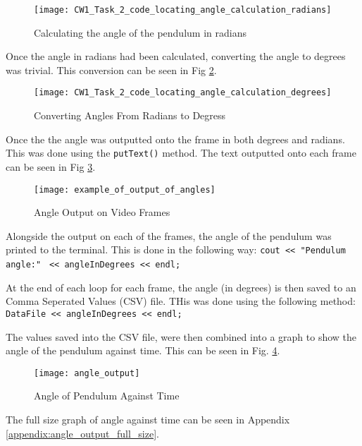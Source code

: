 \documentclass[conference]{IEEEtran}
\begin{document}
\begin{figure}
\centerline{\texttt{[image: CW1\_Task\_2\_code\_locating\_angle\_calculation\_radians]}}
\caption{Calculating the angle of the pendulum in radians}
\label{fig:CW1_Task_2_code_locating_angle_calculation_radians}
\end{figure}

Once the angle in radians had been calculated, converting the angle to degrees was trivial. This conversion can be seen in Fig \ref{fig:CW1_Task_2_code_locating_angle_calculation_degrees}.

\begin{figure}
\centerline{\texttt{[image: CW1\_Task\_2\_code\_locating\_angle\_calculation\_degrees]}}
\caption{Converting Angles From Radians to Degress}
\label{fig:CW1_Task_2_code_locating_angle_calculation_degrees}
\end{figure}

Once the the angle was outputted onto the frame in both degrees and radians. This was done using the \verb|putText()| method. The text outputted onto each frame can be seen in Fig \ref{fig:example_of_output_of_angles}.

\begin{figure}
\centerline{\texttt{[image: example\_of\_output\_of\_angles]}}
\caption{Angle Output on Video Frames}
\label{fig:example_of_output_of_angles}
\end{figure}

Alongside the output on each of the frames, the angle of the pendulum was printed to the terminal. This is done in the following way: \verb|cout << "Pendulum angle:"|
\verb| << angleInDegrees << endl;|

At the end of each loop for each frame, the angle (in degrees) is then saved to an Comma Seperated Values (CSV) file. THis was done using the following method: \verb|DataFile << angleInDegrees << endl;|

The values saved into the CSV file, were then combined into a graph to show the angle of the pendulum against time. This can be seen in Fig. \ref{fig:angle_output}.

\begin{figure}
\centerline{\texttt{[image: angle\_output]}}
\caption{Angle of Pendulum Against Time}
\label{fig:angle_output}
\end{figure}

The full size graph of angle against time can be seen in Appendix \ref{appendix:angle_output_full_size}.
\end{document}
